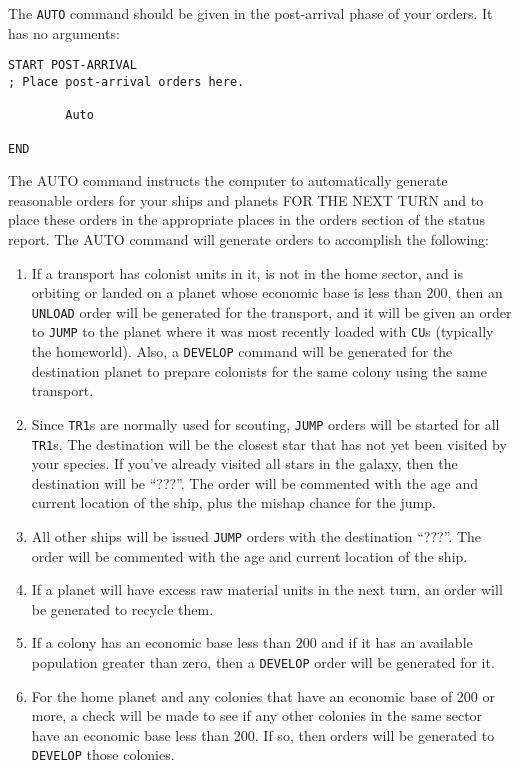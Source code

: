 \documentclass[10pt,titlepage]{article}
\begin{document}
The \texttt{AUTO} command should be given in the post-arrival phase of your orders. It
has no arguments:

\begin{verbatim}
START POST-ARRIVAL
; Place post-arrival orders here.

        Auto

END\end{verbatim} 


The AUTO command instructs the computer to automatically generate reasonable
orders for your ships and planets FOR THE NEXT TURN and to place these orders
in the appropriate places in the orders section of the status report.  The
AUTO command will generate orders to accomplish the following:
\begin{enumerate}
 	\item If a transport has colonist units in it, is not in the home
	sector, and is orbiting or landed on a planet whose economic
	base is less than 200, then an \texttt{UNLOAD} order will be generated
	for the transport, and it will be given an order to \texttt{JUMP} to the
	planet where it was most recently loaded with \texttt{CU}s (typically the
	homeworld).  Also, a \texttt{DEVELOP} command will be generated for the
	destination planet to prepare colonists for the same colony
	using the same transport.

	\item Since \texttt{TR1}s are normally used for scouting, \texttt{JUMP} orders will
	be started for all \texttt{TR1}s.  The destination will be the closest star
	that has not yet been visited by your species.  If you've already
	visited all stars in the galaxy, then the destination will be ``???''.
	The order will be commented with the age and current location of
	the ship, plus the mishap chance for the jump.

	\item All other ships will be issued \texttt{JUMP} orders with the destination
	``???''.  The order will be commented with the age and current
	location of the ship.

	\item If a planet will have excess raw material units in the next
	turn, an order will be generated to recycle them.

	\item If a colony has an economic base less than 200 and if it has
	an available population greater than zero, then a \texttt{DEVELOP} order
	will be generated for it.

	\item For the home planet and any colonies that have an economic
	base of 200 or more, a check will be made to see if any other
	colonies in the same sector have an economic base less than 200.
	If so, then orders will be generated to \texttt{DEVELOP} those colonies.


\end{enumerate}
\end{document}
